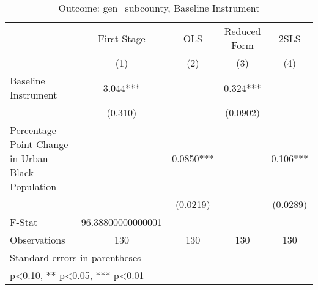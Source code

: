\begin{table}[htbp]\centering
\def\sym#1{\ifmmode^{#1}\else\(^{#1}\)\fi}
\caption{Outcome: gen\_subcounty, Baseline Instrument}
\begin{tabular}{l*{4}{c}}
\toprule
                    & First Stage   &         OLS   &Reduced Form   &        2SLS   \\
                    &\multicolumn{1}{c}{(1)}   &\multicolumn{1}{c}{(2)}   &\multicolumn{1}{c}{(3)}   &\multicolumn{1}{c}{(4)}   \\
\midrule
Baseline Instrument &       3.044***&               &       0.324***&               \\
                    &     (0.310)   &               &    (0.0902)   &               \\
\addlinespace
Percentage Point Change in Urban Black Population&               &      0.0850***&               &       0.106***\\
                    &               &    (0.0219)   &               &    (0.0289)   \\
\midrule
F-Stat              &96.38800000000001   &               &               &               \\
Observations        &         130   &         130   &         130   &         130   \\
\bottomrule
\multicolumn{5}{l}{\footnotesize Standard errors in parentheses}\\
\multicolumn{5}{l}{\footnotesize * p<0.10, ** p<0.05, *** p<0.01}\\
\end{tabular}
\end{table}
